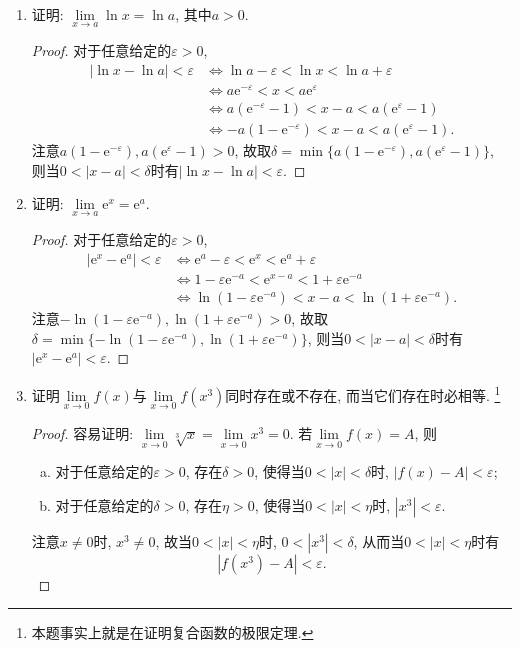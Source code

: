 \documentclass[a4paper,11pt,twoside]{ctexbook}
\newcommand{\e}{\mathrm e}
\begin{document}
\begin{enumerate}
	\item 证明: $\lim\limits_{x\to a} \ln{x}=\ln{a}$, 其中$a>0$.
	      \begin{proof}
		      对于任意给定的$\varepsilon>0$,
		      \[
			      \begin{split}
				      |\ln{x}-\ln{a}|<\varepsilon &\Leftrightarrow  \ln{a}-\varepsilon<\ln{x}<\ln{a}+\varepsilon \\
				      &\Leftrightarrow  a\e^{-\varepsilon}<x<a\e^{\varepsilon}\\
				      &\Leftrightarrow  a(\e^{-\varepsilon}-1)<x-a<a(\e^{\varepsilon}-1)\\
				      &\Leftrightarrow -a(1-\e^{-\varepsilon})<x-a<a(\e^{\varepsilon}-1).
			      \end{split}
		      \]
		      注意$a(1-\e^{-\varepsilon}), a(\e^{\varepsilon}-1)>0$, 故取$\delta=\min\{a(1-\e^{-\varepsilon}), a(\e^{\varepsilon}-1)\}$, 则当$0<|x-a|<\delta$时有$|\ln{x}-\ln{a}|<\varepsilon$. \qedhere
	      \end{proof}

	\item 证明: $\lim\limits_{x\to a} \e^{x}=\e^{a}$.
	      \begin{proof}
		      对于任意给定的$\varepsilon>0$,
		      \[
			      \begin{split}
				      |\e^{x}-\e^{a}|<\varepsilon &\Leftrightarrow \e^{a}-\varepsilon<\e^{x}<\e^{a}+\varepsilon\\
				      &\Leftrightarrow 1-\varepsilon\e^{-a}<\e^{x-a}<1+\varepsilon\e^{-a}\\
				      &\Leftrightarrow \ln(1-\varepsilon\e^{-a})<x-a<\ln(1+\varepsilon\e^{-a}).
			      \end{split}
		      \]
		      注意$-\ln(1-\varepsilon\e^{-a}),\ln(1+\varepsilon\e^{-a})>0$, 故取$\delta=\min\{-\ln(1-\varepsilon\e^{-a}),\ln(1+\varepsilon\e^{-a})\}$, 则当$0<|x-a|<\delta$时有$|\e^{x}-\e^{a}|<\varepsilon$. \qedhere
	      \end{proof}

	\item 证明$\lim\limits_{x\to 0} f(x)$与$\lim\limits_{x\to 0} f(x^3)$同时存在或不存在, 而当它们存在时必相等. \footnote{本题事实上就是在证明复合函数的极限定理.}
	      \begin{proof}
		      容易证明: $\lim\limits_{x\to 0} \sqrt[3]{x}=\lim\limits_{x\to 0} x^3=0$.
		      若$\lim\limits_{x\to 0} f(x)=A$, 则
		      \begin{enumerate}[(a)]
			      \item 对于任意给定的$\varepsilon>0$, 存在$\delta>0$, 使得当$0<|x|<\delta$时, $|f(x)-A|<\varepsilon$;
			      \item 对于任意给定的$\delta>0$, 存在$\eta>0$, 使得当$0<|x|<\eta$时, $|x^3|<\varepsilon$.
		      \end{enumerate}
		      注意$x\neq 0$时, $x^3\neq 0$, 故当$0<|x|<\eta$时, $0<|x^3|<\delta$, 从而当$0<|x|<\eta$时有
		      \[
			      |f(x^3)-A|<\varepsilon.
		      \]


\end{proof}
\end{enumerate}
\end{document}

